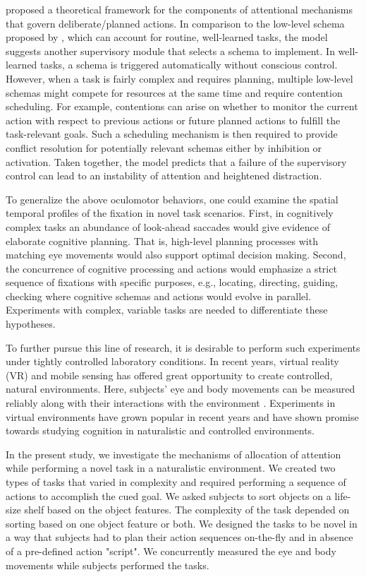 \citet{Norman1986-qb} proposed a theoretical framework for the components of attentional mechanisms that govern deliberate/planned actions. In comparison to the low-level schema proposed by \citet{Land2006-da}, which can account for routine, well-learned tasks, the \citet{Norman1986-qb} model suggests another supervisory module that selects a schema to implement. In well-learned tasks, a schema is triggered automatically without conscious control. However, when a task is fairly complex and requires planning, multiple low-level schemas might compete for resources at the same time and require contention scheduling. For example, contentions can arise on whether to monitor the current action with respect to previous actions or future planned actions to fulfill the task-relevant goals. Such a scheduling mechanism is then required to provide conflict resolution for potentially relevant schemas either by inhibition or activation. Taken together, the model predicts that a failure of the supervisory control can lead to an instability of attention and heightened distraction.

To generalize the above oculomotor behaviors, one could examine the spatial temporal profiles of the fixation in novel task scenarios. First, in cognitively complex tasks an abundance of look-ahead saccades would give evidence of elaborate cognitive planning. That is, high-level planning processes with matching eye movements would also support optimal decision making. Second, the concurrence of cognitive processing and actions would emphasize a strict sequence of fixations with specific purposes, e.g., locating, directing, guiding, checking where cognitive schemas and actions would evolve in parallel. Experiments with complex, variable tasks are needed to differentiate these hypotheses. 

To further pursue this line of research, it is desirable to perform such experiments under tightly controlled laboratory conditions. In recent years, virtual reality (VR) and mobile sensing has offered great opportunity to create controlled, natural environments. Here, subjects’ eye and body movements can be measured reliably along with their interactions with the environment \citep{Keshava2020-cp,Keshava2021-ei, Clay2019-cu, Mann2019-ls}. Experiments in virtual environments have grown popular in recent years and have shown promise towards studying cognition in naturalistic and controlled environments.

In the present study, we investigate the mechanisms of allocation of attention while performing a novel task in a naturalistic environment. We created two types of tasks that varied in complexity and required performing a sequence of actions to accomplish the cued goal. We asked subjects to sort objects on a life-size shelf based on the object features. The complexity of the task depended on sorting based on one object feature or both. We designed the tasks to be novel in a way that subjects had to plan their action sequences on-the-fly and in absence of a pre-defined action "script". We concurrently measured the eye and body movements while subjects performed the tasks.

